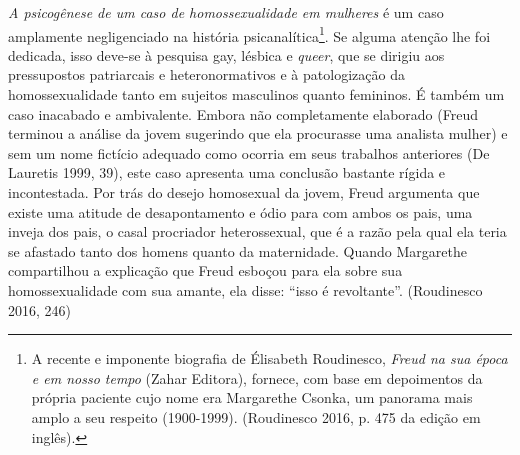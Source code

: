 \emph{A psicogênese de um caso de homossexualidade em mulheres} é um
caso amplamente negligenciado na história psicanalítica\footnote{A
  recente e imponente biografia de Élisabeth Roudinesco, \emph{Freud na
  sua época e em nosso tempo} (Zahar Editora), fornece, com base em
  depoimentos da própria paciente cujo nome era Margarethe Csonka, um
  panorama mais amplo a seu respeito (1900-1999). (Roudinesco 2016, p.
  475 da edição em inglês).}. Se alguma atenção lhe foi dedicada, isso
deve-se à pesquisa gay, lésbica e \emph{queer}, que se dirigiu aos
pressupostos patriarcais e heteronormativos e à patologização da
homossexualidade tanto em sujeitos masculinos quanto femininos. É também
um caso inacabado e ambivalente. Embora não completamente elaborado
(Freud terminou a análise da jovem sugerindo que ela procurasse uma
analista mulher) e sem um nome fictício adequado como ocorria em seus
trabalhos anteriores (De Lauretis 1999, 39), este caso apresenta uma
conclusão bastante rígida e incontestada. Por trás do desejo homosexual
da jovem, Freud argumenta que existe uma atitude de desapontamento e
ódio para com ambos os pais, uma inveja dos pais, o casal procriador
heterossexual, que é a razão pela qual ela teria se afastado tanto dos
homens quanto da maternidade. Quando Margarethe compartilhou a
explicação que Freud esboçou para ela sobre sua homossexualidade com sua
amante, ela disse: ``isso é revoltante''. (Roudinesco 2016, 246)

